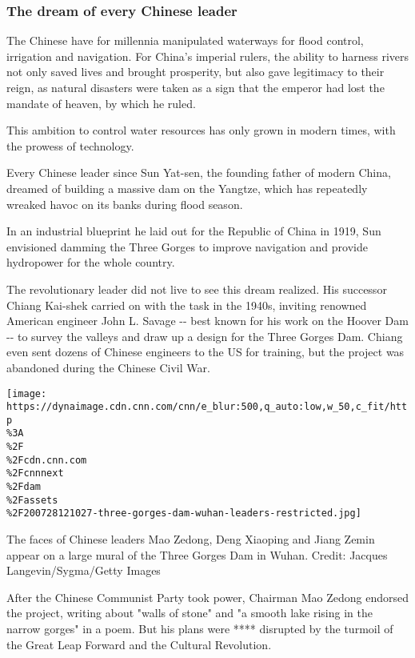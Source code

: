 \hypertarget{the-dream-of-every-chinese-leader}{%
\subsubsection{The dream of every Chinese
leader}\label{the-dream-of-every-chinese-leader}}

The Chinese have for millennia manipulated waterways for flood control,
irrigation and navigation. For China's imperial rulers, the ability to
harness rivers not only saved lives and brought prosperity, but also
gave legitimacy to their reign, as natural disasters were taken as a
sign that the emperor had lost the mandate of heaven, by which he ruled.

This ambition to control water resources has only grown in modern times,
with the prowess of technology.

Every Chinese leader since Sun Yat-sen, the founding father of modern
China, dreamed of building a massive dam on the Yangtze, which has
repeatedly wreaked havoc on its banks during flood season.

In an industrial blueprint he laid out for the Republic of China in
1919, Sun envisioned damming the Three Gorges to improve navigation and
provide hydropower for the whole country.

The revolutionary leader did not live to see this dream realized. His
successor Chiang Kai-shek carried on with the task in the 1940s,
inviting renowned American engineer John L. Savage -\/- best known for
his work on the Hoover Dam -\/- to survey the valleys and draw up a
design for the Three Gorges Dam. Chiang even sent dozens of Chinese
engineers to the US for training, but the project was abandoned during
the Chinese Civil War.

\texttt{[image: https://dynaimage.cdn.cnn.com/cnn/e\_blur:500,q\_auto:low,w\_50,c\_fit/http\\\%3A\\\%2F\\\%2Fcdn.cnn.com\\\%2Fcnnnext\\\%2Fdam\\\%2Fassets\\\%2F200728121027-three-gorges-dam-wuhan-leaders-restricted.jpg]}

The faces of Chinese leaders Mao Zedong, Deng Xiaoping and Jiang Zemin
appear on a large mural of the Three Gorges Dam in Wuhan. Credit:
Jacques Langevin/Sygma/Getty Images

After the Chinese Communist Party took power, Chairman Mao Zedong
endorsed the project, writing about "walls of stone" and "a smooth lake
rising in the narrow gorges" in a poem. But his plans were ****
disrupted by the turmoil of the Great Leap Forward and the Cultural
Revolution.

